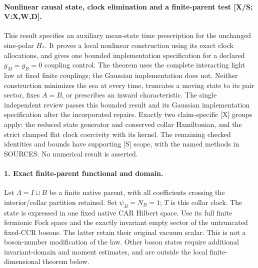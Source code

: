 \documentclass[11pt]{article}
\begin{document}
\paragraph{Nonlinear causal state, clock elimination and a finite-parent test
[X/S; V:X,W,D].}
This result specifies an auxiliary mean-state time prescription for the
unchanged sine-polar $H_*$.  It proves a local nonlinear construction using
its exact clock allocations, and gives one bounded implementation
specification for a declared $g_M=g_B=0$ coupling control.  The theorem
uses the complete interacting light law at fixed finite couplings; the
Gaussian implementation does not.  Neither construction minimizes the
sea at every time, truncates a moving state to its pair sector, fixes
$A=B$, or prescribes an inward characteristic.  The single independent
review  passes this bounded
result and its Gaussian implementation specification after the
incorporated repairs.  Exactly two claim-specific [X] groups apply:
the reduced state generator and conserved collar Hamiltonian, and
the strict clamped flat clock coercivity with its kernel.  The
remaining checked identities and bounds have supporting [S] scope,
with the named methods in SOURCES.  No numerical result is asserted.

\paragraph{1. Exact finite-parent functional and domain.}
Let $\Lambda=I\sqcup B$ be a finite native parent, with all coefficients
crossing the interior/collar partition retained.  Set $\psi_B=N_B=1$;
$T$ is this collar clock.  The state is expressed in one fixed native
CAR Hilbert space.  Use its full finite fermionic Fock space and the
exactly invariant empty sector of the untruncated fixed-CCR bosons.
The latter retain their original vacuum scalar.  This is not a
boson-number modification of the law.  Other boson states require
additional invariant-domain and moment estimates, and are outside the
local finite-dimensional theorem below.
\end{document}
